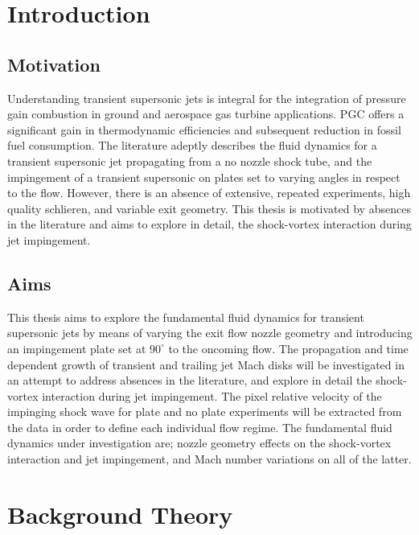 

\newpage
{}
\section{Introduction} 

\subsection{Motivation}
Understanding transient supersonic jets is integral for the integration of pressure gain combustion in ground and aerospace gas turbine applications. PGC offers a significant gain in thermodynamic efficiencies and subsequent reduction in fossil fuel consumption. The literature adeptly describes the fluid dynamics for a transient supersonic jet propagating from a no nozzle shock tube, and the impingement of a transient supersonic on plates set to varying angles in respect to the flow. However, there is an absence of extensive, repeated experiments, high quality schlieren, and variable exit geometry. This thesis is motivated by absences in the literature and aims to explore in detail, the shock-vortex interaction during jet impingement.

\subsection{Aims}
This thesis aims to explore the fundamental fluid dynamics for transient supersonic jets by means of varying the exit flow nozzle geometry and introducing an impingement plate set at $90^{\circ}$ to the oncoming flow. The propagation and time dependent growth of transient and trailing jet Mach disks will be investigated in an attempt to address absences in the literature, and explore in detail the shock-vortex interaction during jet impingement. The pixel relative velocity of the impinging shock wave for plate and no plate experiments will be extracted from the data in order to define each individual flow regime. The fundamental fluid dynamics under investigation are; nozzle geometry effects on the shock-vortex interaction and jet impingement, and Mach number variations on all of the latter.


\newpage

\section{Background Theory} \label{sec:background}
